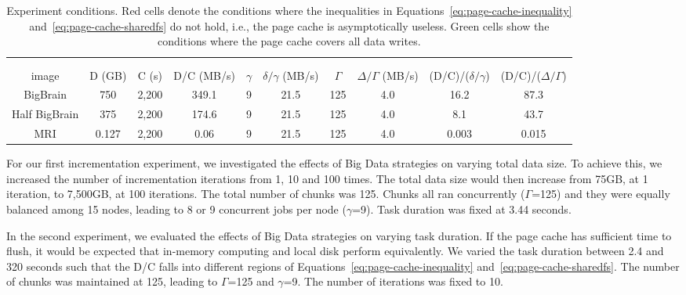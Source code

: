 \documentclass{IEEEtran}
\begin{document}
\begin{table*}
\begin{tabular}{c|ccc|cccc|cc}
\hline
  \multicolumn{10}{c}{}\\ 
 \rowcolor{headcolor}
  \multicolumn{10}{c}{Experiment 4: Image Size}\\
  \hline
  \rowcolor{headcolor}
 image  &
 D (GB) & C (s) & D/C (MB/s) &
 $\gamma$ & $\delta/\gamma$ (MB/s) & $\Gamma$ & $\Delta/\Gamma$ (MB/s)&
(D/C)/($\delta/\gamma$) & (D/C)/($\Delta/\Gamma$)\\
 \hline
 BigBrain      & 750   & 2,200   & 349.1     & 9  & 21.5  & 125 & 4.0 &  \cellcolor{red!20} 16.2 & \cellcolor{red!20} 87.3   \\
 Half BigBrain & 375   & 2,200   & 174.6     & 9  & 21.5  & 125 & 4.0 &  \cellcolor{red!20} 8.1 & \cellcolor{red!20} 43.7   \\
 MRI           & 0.127 & 2,200   & 0.06      & 9  & 21.5  & 125 & 4.0 &  \cellcolor{green!20} 0.003 & \cellcolor{green!20} 0.015  
\end{tabular}
\caption{Experiment conditions. Red cells denote the conditions where 
the inequalities in Equations~\ref{eq:page-cache-inequality} 
and~\ref{eq:page-cache-sharedfs} do not hold, i.e., the page cache is 
asymptotically useless. Green cells show the conditions where the page cache covers all data writes.}
\label{table:experiments}
\end{table*}

For our first incrementation experiment, we investigated the effects of 
Big Data strategies on varying total data size. To achieve this, we 
increased the number of incrementation iterations from 1, 10 and 100 
times. The total data size would then increase from 75GB, at 1 
iteration, to 7,500GB, at 100 iterations. The total number of chunks 
was 125. Chunks all ran concurrently ($\Gamma$=125) and they were 
equally balanced among 15 nodes, leading to 8 or 9 concurrent jobs per 
node ($\gamma$=9). Task duration was fixed at 3.44 seconds.

In the second experiment, we evaluated the effects of Big Data 
strategies on varying task duration. If the page cache has sufficient 
time to flush, it would be expected that in-memory computing 
and local disk perform equivalently. We varied the task 
duration between 2.4 and 320 seconds such that the D/C falls into 
different regions of Equations~\ref{eq:page-cache-inequality} 
and~\ref{eq:page-cache-sharedfs}. The number of chunks was maintained 
at 125, leading to $\Gamma$=125 and $\gamma$=9. The number of iterations was
fixed to 10.
\end{document}
